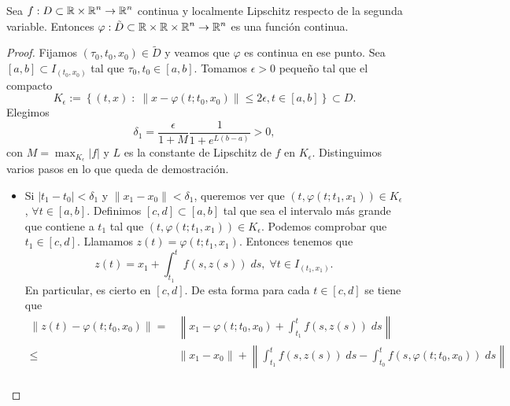 \begin{theorem}
	Sea $\displaystyle f : D \subset \mathbb{R} \times \mathbb{R}^{n} \to \mathbb{R}^{n} $ continua y localmente Lipschitz respecto de la segunda variable. Entonces $\displaystyle \varphi : \tilde{D} \subset \mathbb{R} \times \mathbb{R} \times \mathbb{R}^{n} \to \mathbb{R}^{n} $ es una función continua. 
\end{theorem}
\begin{proof}
	Fijamos $\displaystyle \left(\tau_{0}, t_{0}, x_{0}\right)\in \tilde{D} $ y veamos que $\displaystyle \varphi $ es continua en ese punto. Sea $\displaystyle \left[a,b\right] \subset I_{\left(t_{0}, x_{0}\right)} $ tal que $\displaystyle \tau_{0}, t_{0} \in \left[a,b\right]  $. Tomamos $\displaystyle \epsilon > 0 $ pequeño tal que el compacto
	\[K_{\epsilon }:= \left\{ \left(t,x\right) \; : \; \|x-\varphi\left(t; t_{0}, x_{0}\right)\| \leq 2\epsilon , t \in \left[a,b\right] \right\}  \subset D.\]
Elegimos 
\[\delta_{1} = \frac{\epsilon }{1+M}\frac{1}{1 + e^{L\left(b-a\right)}} > 0 ,\]
con $\displaystyle M = \max_{K_{\epsilon }} \left|f\right| $ y $\displaystyle L $ es la constante de Lipschitz de $\displaystyle f $ en $\displaystyle K_{\epsilon } $. Distinguimos varios pasos en lo que queda de demostración.
\begin{itemize}
	\item Si $\displaystyle \left|t_{1}-t_{0}\right|<\delta _{1} $ y $\displaystyle \|x_{1}-x_{0}\| < \delta _{1} $, queremos ver que $\displaystyle \left(t, \varphi\left(t; t_{1}, x_{1}\right)\right) \in K_{\epsilon } $, $\displaystyle \forall t \in \left[a,b\right]  $. Definimos $\displaystyle \left[c,d\right] \subset \left[a,b\right]  $ tal que sea el intervalo más grande que contiene a $\displaystyle t_{1} $ tal que $\displaystyle \left(t, \varphi\left(t; t_{1}, x_{1}\right)\right)\in K_{\epsilon } $. Podemos comprobar que $\displaystyle t_{1}\in \left[c,d\right]  $. 
Llamamos $\displaystyle z\left(t\right)=\varphi\left(t; t_{1}, x_{1}\right) $. Entonces tenemos que 
\[z\left(t\right)=x_{1} + \int^{t}_{t_{1}} f\left(s, z\left(s\right)\right) \; d s, \; \forall t \in I_{\left(t_{1}, x_{1}\right)} .\]
En particular, es cierto en $\displaystyle \left[c,d\right]  $. De esta forma para cada $\displaystyle t \in \left[c,d\right]  $ se tiene que 
\[
\begin{split}
	\|z\left(t\right)-\varphi\left(t; t_{0}, x_{0}\right)\| = & \left\|x_{1}-\varphi\left(t; t_{0}, x_{0}\right)+\int^{t}_{t_{1}} f\left(s,z\left(s\right)\right) \; d s\right\| \\
	\leq & \|x_{1}-x_{0}\| + \left\|\int^{t}_{t_{1}} f\left(s,z\left(s\right)\right) \; d s-\int^{t}_{t_{0}} f\left(s, \varphi\left(t; t_{0}, x_{0}\right)\right) \; d s\right\| \\

\end{split}\]
\end{itemize}
\end{proof}
